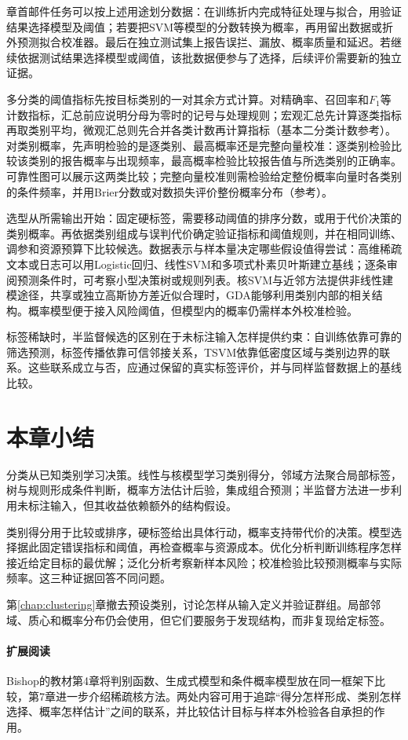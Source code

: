 章首邮件任务可以按上述用途划分数据：在训练折内完成特征处理与拟合，用验证结果选择模型及阈值；若要把SVM等模型的分数转换为概率，再用留出数据或折外预测拟合校准器。最后在独立测试集上报告误拦、漏放、概率质量和延迟。若继续依据测试结果选择模型或阈值，该批数据便参与了选择，后续评价需要新的独立证据。

多分类的阈值指标先按目标类别的一对其余方式计算。对精确率、召回率和$F_1$等计数指标，汇总前应说明分母为零时的记号与处理规则；宏观汇总先计算逐类指标再取类别平均，微观汇总则先合并各类计数再计算指标（基本二分类计数参考）。对类别概率，先声明检验的是逐类别、最高概率还是完整向量校准：逐类别检验比较该类别的报告概率与出现频率，最高概率检验比较报告值与所选类别的正确率。可靠性图可以展示这两类比较；完整向量校准则需检验给定整份概率向量时各类别的条件频率，并用Brier分数或对数损失评价整份概率分布（参考）。

选型从所需输出开始：固定硬标签，需要移动阈值的排序分数，或用于代价决策的类别概率。再依据类别组成与误判代价确定验证指标和阈值规则，并在相同训练、调参和资源预算下比较候选。数据表示与样本量决定哪些假设值得尝试：高维稀疏文本或日志可以用Logistic回归、线性SVM和多项式朴素贝叶斯建立基线；逐条审阅预测条件时，可考察小型决策树或规则列表。核SVM与近邻方法提供非线性建模途径，共享或独立高斯协方差近似合理时，GDA能够利用类别内部的相关结构。概率模型便于接入风险阈值，但模型内的概率仍需样本外校准检验。

标签稀缺时，半监督候选的区别在于未标注输入怎样提供约束：自训练依靠可靠的筛选预测，标签传播依靠可信邻接关系，TSVM依靠低密度区域与类别边界的联系。这些联系成立与否，应通过保留的真实标签评价，并与同样监督数据上的基线比较。

\section{本章小结}
\label{sec:classification-summary}

分类从已知类别学习决策。线性与核模型学习类别得分，邻域方法聚合局部标签，树与规则形成条件判断，概率方法估计后验，集成组合预测；半监督方法进一步利用未标注输入，但其收益依赖额外的结构假设。

类别得分用于比较或排序，硬标签给出具体行动，概率支持带代价的决策。模型选择据此固定错误指标和阈值，再检查概率与资源成本。优化分析判断训练程序怎样接近给定目标的最优解；泛化分析考察新样本风险；校准检验比较预测概率与实际频率。这三种证据回答不同问题。

第\ref{chap:clustering}章撤去预设类别，讨论怎样从输入定义并验证群组。局部邻域、质心和概率分布仍会使用，但它们要服务于发现结构，而非复现给定标签。

\paragraph{扩展阅读}
Bishop的教材第4章将判别函数、生成式模型和条件概率模型放在同一框架下比较，第7章进一步介绍稀疏核方法。两处内容可用于追踪“得分怎样形成、类别怎样选择、概率怎样估计”之间的联系，并比较估计目标与样本外检验各自承担的作用。